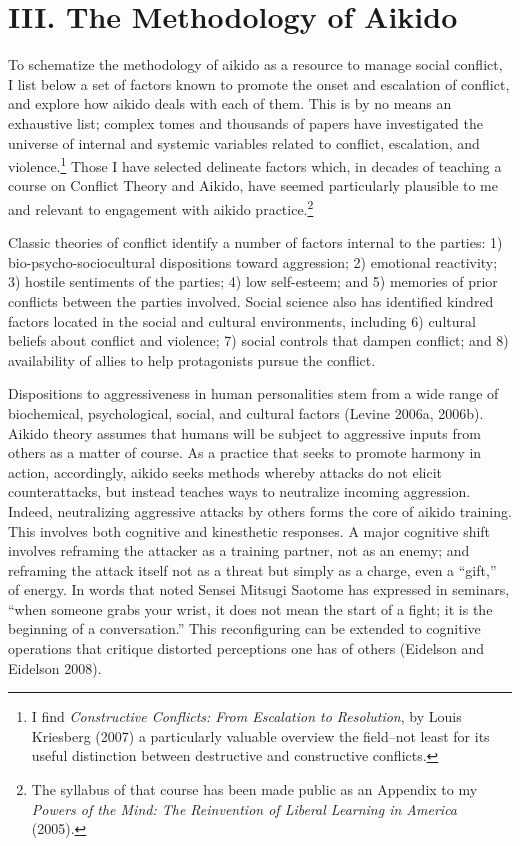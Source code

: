 \section*{III. The Methodology of Aikido}

To schematize the methodology of aikido as a resource to manage social conflict, I list below a set of factors known to promote the onset and escalation of conflict, and explore how aikido deals with each of them. This is by no means an exhaustive list; complex tomes and thousands of papers have investigated the universe of internal and systemic variables related to conflict, escalation, and violence.\footnote{I find \emph{Constructive Conflicts: From Escalation to Resolution}, by Louis Kriesberg (2007) a particularly valuable overview the field–not least for its useful distinction between destructive and constructive conflicts.} Those I have selected delineate factors which, in decades of teaching a course on Conflict Theory and Aikido, have seemed particularly plausible to me and relevant to engagement with aikido practice.\footnote{The syllabus of that course has been made public as an Appendix to my \emph{Powers of the Mind: The Reinvention of Liberal Learning in America} (2005).}

Classic theories of conflict identify a number of factors internal to the parties: 1) bio-psycho-sociocultural dispositions toward aggression; 2) emotional reactivity; 3) hostile sentiments of the parties; 4) low self-esteem; and 5) memories of prior conflicts between the parties involved. Social science also has identified kindred factors located in the social and cultural environments, including 6) cultural beliefs about conflict and violence; 7) social controls that dampen conflict; and 8) availability of allies to help protagonists pursue the conflict. 

Dispositions to aggressiveness in human personalities stem from a wide range of biochemical, psychological, social, and cultural factors (Levine 2006a, 2006b). Aikido theory assumes that humans will be subject to aggressive inputs from others as a matter of course. As a practice that seeks to promote harmony in action, accordingly, aikido seeks methods whereby attacks do not elicit counterattacks, but instead teaches ways to neutralize incoming aggression. Indeed, neutralizing aggressive attacks by others forms the core of aikido training. This involves both cognitive and kinesthetic responses. A major cognitive shift involves reframing the attacker as a training partner, not as an enemy; and reframing the attack itself not as a threat but simply as a charge, even a ``gift,'' of energy. In words that noted Sensei Mitsugi Saotome has expressed in seminars, ``when someone grabs your wrist, it does not mean the start of a fight; it is the beginning of a conversation.'' This reconfiguring can be extended to cognitive operations that critique distorted perceptions one has of others (Eidelson and Eidelson 2008). 

